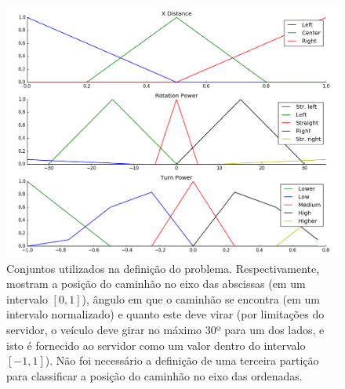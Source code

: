 \documentclass{article}
\begin{document}
\begin{figure}[ht]
    \centering
    \includegraphics[scale=0.45]{figure_1}
    \caption{Conjuntos utilizados na definição do problema. Respectivamente,
        mostram a posição do caminhão no eixo das abscissas (em um intervalo
        $[0, 1]$), ângulo em que o caminhão se encontra (em um intervalo
        normalizado) e quanto este deve virar (por limitações do servidor, o
        veículo deve girar no máximo 30º para um dos lados, e isto é fornecido
        ao servidor como um valor dentro do intervalo $[-1, 1]$). Não foi
        necessário a definição de uma terceira partição para classificar a
        posição do caminhão no eixo das ordenadas.}
    \label{fig01}
\end{figure}
\end{document}
